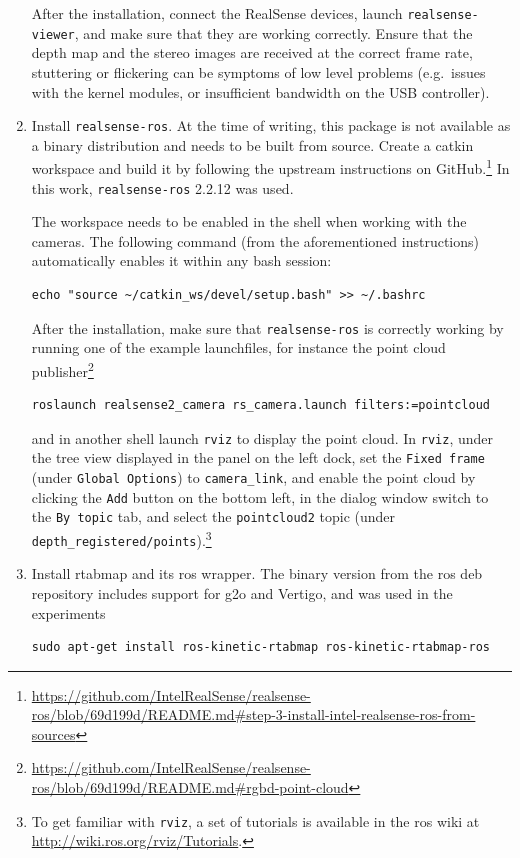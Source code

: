\documentclass[11pt, letterpaper, twoside]{article}
\begin{document}
\begin{enumerate}
        After the installation, connect the RealSense devices, launch
        \texttt{realsense-viewer}, and make sure that they are working
        correctly. Ensure that the depth map and the stereo images are received
        at the correct frame rate, stuttering or flickering can be symptoms of
        low level problems (e.g.\ issues with the kernel modules, or
        insufficient bandwidth on the USB controller).

    \item Install \texttt{realsense-ros}. At the time of writing, this package
        is not available as a binary distribution and needs to be built from
        source. Create a catkin workspace and build it by following the
        upstream instructions on
        GitHub.\footnote{\url{https://github.com/IntelRealSense/realsense-ros/blob/69d199d/README.md\#step-3-install-intel-realsense-ros-from-sources}}
        In this work, \texttt{realsense-ros} 2.2.12 was used.

        The workspace needs to be enabled in the shell when working with the
        cameras. The following command (from the aforementioned instructions)
        automatically enables it within any bash session:
\begin{verbatim}
echo "source ~/catkin_ws/devel/setup.bash" >> ~/.bashrc
\end{verbatim}
        After the installation, make sure that \texttt{realsense-ros} is
        correctly working by running one of the example launchfiles, for
        instance the point cloud publisher\footnote{\url{https://github.com/IntelRealSense/realsense-ros/blob/69d199d/README.md\#rgbd-point-cloud}}
\begin{verbatim}
roslaunch realsense2_camera rs_camera.launch filters:=pointcloud
\end{verbatim}
        and in another shell launch \texttt{rviz} to display the point cloud.
        In \texttt{rviz}, under the tree view displayed in the panel on the
        left dock, set the \texttt{Fixed frame} (under \texttt{Global Options})
        to \texttt{camera\_link}, and enable the point cloud by clicking the
        \texttt{Add} button on the bottom left, in the dialog window switch to
        the \texttt{By topic} tab, and select the \texttt{pointcloud2} topic
        (under \texttt{depth\_registered/points}).\footnote{To get familiar
        with \texttt{rviz}, a set of tutorials is available in the \gls{ros}
        wiki at \url{http://wiki.ros.org/rviz/Tutorials}.}

    \item Install \gls{rtabmap} and its \gls{ros} wrapper. The binary version
        from the \gls{ros} deb repository includes support for g2o and Vertigo,
        and was used in the experiments
\begin{verbatim}
sudo apt-get install ros-kinetic-rtabmap ros-kinetic-rtabmap-ros
\end{verbatim}


\end{enumerate}
\end{document}
